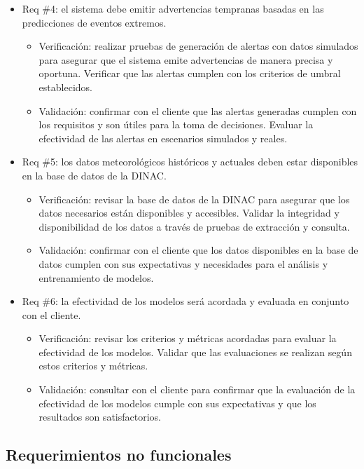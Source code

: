 \documentclass[
11pt, %
codirector, %
]{charter}
\begin{document}
\begin{itemize}
\item Req \#4: el sistema debe emitir advertencias tempranas basadas en las predicciones de eventos extremos.

\begin{itemize}
	\item Verificación: realizar pruebas de generación de alertas con datos simulados para asegurar que el sistema emite advertencias de manera precisa y oportuna. Verificar que las alertas cumplen con los criterios de umbral establecidos.
	\item Validación: confirmar con el cliente que las alertas generadas cumplen con los requisitos y son útiles para la toma de decisiones. Evaluar la efectividad de las alertas en escenarios simulados y reales.
\end{itemize}

\item Req \#5: los datos meteorológicos históricos y actuales deben estar disponibles en la base de datos de la DINAC.

\begin{itemize}
	\item Verificación: revisar la base de datos de la DINAC para asegurar que los datos necesarios están disponibles y accesibles. Validar la integridad y disponibilidad de los datos a través de pruebas de extracción y consulta.
	\item Validación: confirmar con el cliente que los datos disponibles en la base de datos cumplen con sus expectativas y necesidades para el análisis y entrenamiento de modelos.
\end{itemize}

\item Req \#6: la efectividad de los modelos será acordada y evaluada en conjunto con el cliente.

\begin{itemize}
	\item Verificación: revisar los criterios y métricas acordadas para evaluar la efectividad de los modelos. Validar que las evaluaciones se realizan según estos criterios y métricas.
	\item Validación: consultar con el cliente para confirmar que la evaluación de la efectividad de los modelos cumple con sus expectativas y que los resultados son satisfactorios.
\end{itemize}
\end{itemize}

\subsection{Requerimientos no funcionales}
\end{document}
